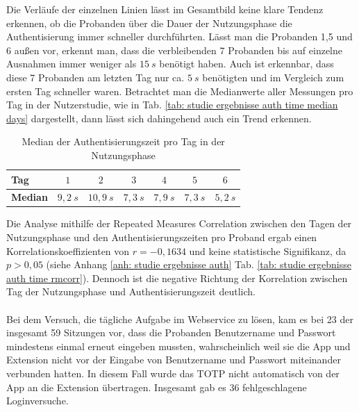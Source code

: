 Die Verläufe der einzelnen Linien lässt im Gesamtbild keine klare Tendenz erkennen, 
ob die Probanden über die Dauer der Nutzungsphase die Authentisierung immer schneller 
durchführten. Lässt man die Probanden 1,5 und 6 außen vor, erkennt man, dass die 
verbleibenden 7 Probanden bis auf einzelne Ausnahmen immer weniger als $15~s$ 
benötigt haben. Auch ist erkennbar, dass diese 7 Probanden am letzten Tag nur ca. 
$5~s$ benötigten und im Vergleich zum ersten Tag schneller waren. Betrachtet man die 
Medianwerte aller Messungen pro Tag in der Nutzerstudie, wie in Tab. \ref{tab: studie 
ergebnisse auth time median days} dargestellt, dann lässt sich dahingehend auch ein 
Trend erkennen.
\begin{table}
    \centering
    \begin{center}
    \begin{tabular}{| l | c | c | c | c | c | c |}
        \hline
        \textbf{Tag} & $1$ & $2$ & $3$ & $4$ & $5$ & $6$ \\
        \hline
        \textbf{Median} & $9{,}2~s$ & $10{,}9~s$ & $7{,}3~s$ & $7{,}9~s$ & $7{,}3~s$ & $5{,}2~s$ \\
        \hline
    \end{tabular}
    \end{center}
    \caption[Median der Authentisierungszeit pro Tag in der Nutzungsphase]{Median der Authentisierungszeit pro Tag in der Nutzungsphase}
    \label{tab: studie ergebnisse auth time median days}
\end{table}
Die Analyse mithilfe der Repeated Measures Correlation zwischen den Tagen der 
Nutzungsphase und den Authentisierungszeiten pro Proband ergab einen 
Korrelationskoeffizienten von $r = -0{,}1634$ und keine statistische Signifikanz, da 
$p > 0{,}05$ (siehe Anhang \ref{anh: studie ergebnisse auth} Tab. \ref{tab: studie 
ergebnisse auth time rmcorr}). Dennoch ist die negative Richtung der Korrelation 
zwischen Tag der Nutzungsphase und Authentisierungszeit deutlich.
\\\\
Bei dem Versuch, die tägliche Aufgabe im Webservice zu lösen, kam es bei 23 der 
insgesamt 59 Sitzungen vor, dass die Probanden Benutzername und Passwort mindestens 
einmal erneut eingeben mussten, wahrscheinlich weil sie die App und Extension 
nicht vor der Eingabe von Benutzername und Passwort miteinander verbunden hatten. In diesem Fall wurde das TOTP nicht automatisch von der 
App an die Extension übertragen. Insgesamt gab es 36 fehlgeschlagene 
Loginversuche.